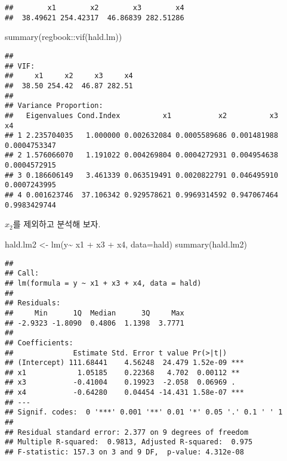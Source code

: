 \documentclass[
]{book}
\newenvironment{Shaded}{\begin{snugshade}}{\end{snugshade}}
\newcommand{\AttributeTok}[1]{\textcolor[rgb]{0.77,0.63,0.00}{#1}}
\newcommand{\FunctionTok}[1]{\textcolor[rgb]{0.00,0.00,0.00}{#1}}
\newcommand{\NormalTok}[1]{#1}
\newcommand{\OtherTok}[1]{\textcolor[rgb]{0.56,0.35,0.01}{#1}}
\newcommand{\SpecialCharTok}[1]{\textcolor[rgb]{0.00,0.00,0.00}{#1}}
\begin{document}
\begin{verbatim}
##        x1        x2        x3        x4 
##  38.49621 254.42317  46.86839 282.51286
\end{verbatim}

\begin{Shaded}
\begin{Highlighting}[]
\FunctionTok{summary}\NormalTok{(regbook}\SpecialCharTok{::}\FunctionTok{vif}\NormalTok{(hald.lm))}
\end{Highlighting}
\end{Shaded}

\begin{verbatim}
## 
## VIF:
##     x1     x2     x3     x4 
##  38.50 254.42  46.87 282.51 
## 
## Variance Proportion:
##   Eigenvalues Cond.Index          x1           x2          x3           x4
## 1 2.235704035   1.000000 0.002632084 0.0005589686 0.001481988 0.0004753347
## 2 1.576066070   1.191022 0.004269804 0.0004272931 0.004954638 0.0004572915
## 3 0.186606149   3.461339 0.063519491 0.0020822791 0.046495910 0.0007243995
## 4 0.001623746  37.106342 0.929578621 0.9969314592 0.947067464 0.9983429744
\end{verbatim}

\(x_2\)를 제외하고 분석해 보자.

\begin{Shaded}
\begin{Highlighting}[]
\NormalTok{hald.lm2 }\OtherTok{\textless{}{-}} \FunctionTok{lm}\NormalTok{(y}\SpecialCharTok{\textasciitilde{}}\NormalTok{ x1 }\SpecialCharTok{+}\NormalTok{ x3 }\SpecialCharTok{+}\NormalTok{ x4, }\AttributeTok{data=}\NormalTok{hald)}
\FunctionTok{summary}\NormalTok{(hald.lm2)}
\end{Highlighting}
\end{Shaded}

\begin{verbatim}
## 
## Call:
## lm(formula = y ~ x1 + x3 + x4, data = hald)
## 
## Residuals:
##     Min      1Q  Median      3Q     Max 
## -2.9323 -1.8090  0.4806  1.1398  3.7771 
## 
## Coefficients:
##              Estimate Std. Error t value Pr(>|t|)    
## (Intercept) 111.68441    4.56248  24.479 1.52e-09 ***
## x1            1.05185    0.22368   4.702  0.00112 ** 
## x3           -0.41004    0.19923  -2.058  0.06969 .  
## x4           -0.64280    0.04454 -14.431 1.58e-07 ***
## ---
## Signif. codes:  0 '***' 0.001 '**' 0.01 '*' 0.05 '.' 0.1 ' ' 1
## 
## Residual standard error: 2.377 on 9 degrees of freedom
## Multiple R-squared:  0.9813, Adjusted R-squared:  0.975 
## F-statistic: 157.3 on 3 and 9 DF,  p-value: 4.312e-08
\end{verbatim}
\end{document}
